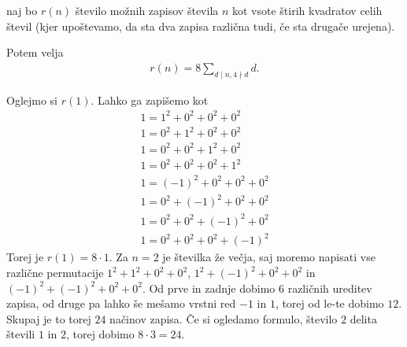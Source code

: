 \begin{izrek}
    naj bo \(r(n)\) število možnih zapisov števila \(n\) kot vsote štirih kvadratov celih števil (kjer upoštevamo, da sta dva zapisa različna tudi, če sta drugače urejena).

    Potem velja
    \begin{align*}
        r(n) = 8\sum_{d\mid n, 4\nmid d} d.
    \end{align*}
\end{izrek}
\begin{primer}
    Oglejmo si \(r(1)\).
    Lahko ga zapišemo kot
    \begin{align*}
        1 = 1^2 + 0^2 + 0^2 + 0^2    \\
        1 = 0^2 + 1^2 + 0^2 + 0^2    \\
        1 = 0^2 + 0^2 + 1^2 + 0^2    \\
        1 = 0^2 + 0^2 + 0^2 + 1^2    \\
        1 = (-1)^2 + 0^2 + 0^2 + 0^2 \\
        1 = 0^2 + (-1)^2 + 0^2 + 0^2 \\
        1 = 0^2 + 0^2 + (-1)^2 + 0^2 \\
        1 = 0^2 + 0^2 + 0^2 + (-1)^2
    \end{align*}
    Torej je \(r(1) = 8 \cdot 1\). Za \(n=2\) je številka že večja, saj moremo napisati vse različne permutacije \(1^2 + 1^2+0^2+0^2\), \(1^2 + (-1)^2+0^2+0^2\) in \((-1)^2 + (-1)^2+0^2+0^2\). Od prve in zadnje dobimo \(6\) različnih ureditev zapisa, od druge pa lahko še mešamo vrstni red \(-1\) in \(1\), torej od le-te dobimo \(12\). Skupaj je to torej \(24\) načinov zapisa. Če si ogledamo formulo, število \(2\) delita števili \(1\) in \(2\), torej dobimo \(8\cdot 3 = 24\).
\end{primer}
